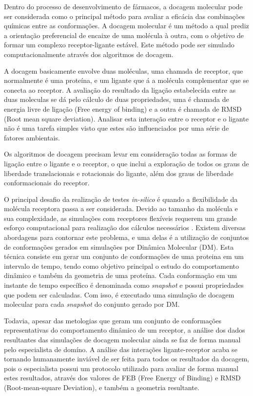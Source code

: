 Dentro do processo de desenvolvimento de fármacos, a docagem molecular pode ser considerada como o principal método para avaliar a eficácia das combinações químicas entre as conformações. A docagem molecular é um método a qual prediz a orientação preferencial de encaixe de uma molécula à outra, com o objetivo de formar um complexo receptor-ligante estável. Este método pode ser simulado computacionalmente através dos algoritmos de docagem. 

A docagem basicamente envolve duas moléculas, uma chamada de receptor, que normalmente é uma proteína, e um ligante que á a molécula complementar que se conecta ao receptor. A avaliação do resultado da ligação estabelecida entre as duas moleculas se dá pelo cálculo de duas propriedades, uma é chamada de energia livre de ligação (Free energy of binding) e a outra é chamada de RMSD (Root mean square deviation). Analisar esta interação entre o receptor e o ligante não é uma tarefa simples visto que estes são influenciados por uma série de fatores ambientais.

Os algoritmos de docagem precisam levar em consideração todas as formas de ligação entre o ligante e o receptor, o que inclui a exploração de todos os graus de liberdade translacionais e rotacionais do ligante, além dos graus de liberdade conformacionais do receptor.

O principal desafio da realização de testes \emph{in-silico} é quando a flexibilidade da molécula receptora passa a ser considerada. Devido ao tamanho da molécula e sua complexidade, as simulações com receptores flexíveis requerem um grande esforço computacional para realização dos cálculos necessários \cite{art08}.
Existem diversas abordagens para contornar este problema, e uma delas é a utilização de conjuntos de conformações gerados em simulações por Dinâmica Molecular (DM). Esta técnica consiste em gerar um conjunto de conformações de uma proteina em um intervalo de tempo, tendo como objetivo principal o estudo do comportamento dinâmico e também da geometria de uma proteína. Cada conformação em um instante de tempo específico é denominada como \emph{snapshot} e possui propriedades que podem ser calculadas. Com isso, é executado uma simulação de docagem molecular para cada \emph{snapshot} do conjunto gerado por DM.

Todavia, apesar das metologias que geram um conjunto de conformações representativas do comportamento dinâmico de um receptor, a análise dos dados resultantes das simulações de docagem molecular ainda se faz de forma manual pelo especialista de domíno. A análise das interações ligante-receptor acaba se tornando humanamente inviável de ser feita para todos os resultados da docagem, pois o especialista possui um protocolo utilizado para avaliar de forma manual estes resultados, através dos valores de FEB (Free Energy of Binding) e RMSD (Root-mean-square Deviation), e também a geometria resultante.

